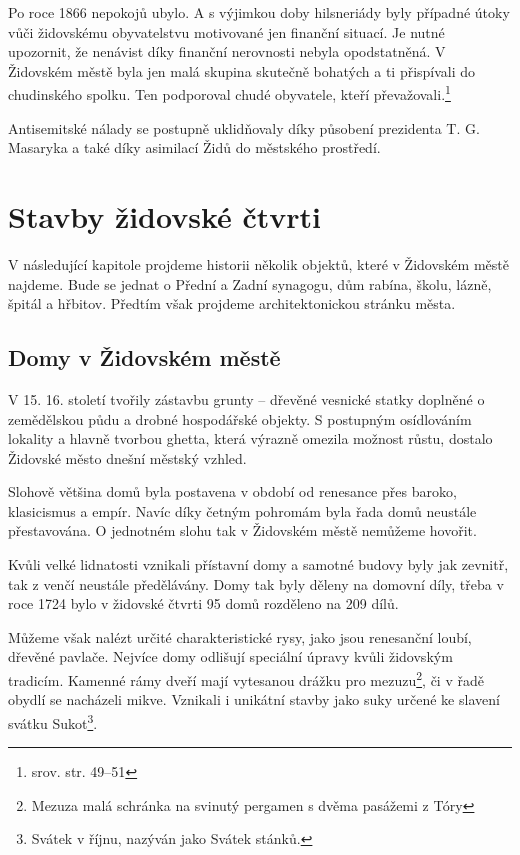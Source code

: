 \documentclass[a4paper,oneside,12pt]{report}
\begin{document}
Po roce 1866 nepokojů ubylo.
A s výjimkou doby hilsneriády byly případné útoky vůči židovskému obyvatelstvu motivované jen finanční situací.
Je nutné upozornit, že nenávist díky finanční nerovnosti nebyla opodstatněná.
V Židovském městě byla jen malá skupina skutečně bohatých a ti přispívali do chudinského spolku.
Ten podporoval chudé obyvatele, kteří převažovali.\footnote{srov. \cite{Svobodva2015} str. 49--51}

Antisemitské nálady se postupně uklidňovaly díky působení prezidenta T. G. Masaryka a také díky asimilací Židů do městského prostředí.

\chapter{Stavby židovské čtvrti}

V následující kapitole projdeme historii několik objektů, které v Židovském městě najdeme.
Bude se jednat o Přední a Zadní synagogu, dům rabína, školu, lázně, špitál a hřbitov.
Předtím však projdeme architektonickou stránku města.

\section{Domy v Židovském městě}

V 15. 16. století tvořily zástavbu grunty -- dřevěné vesnické statky doplněné o zemědělskou půdu a drobné hospodářské objekty.
S postupným osídlováním lokality a hlavně tvorbou ghetta, která výrazně omezila možnost růstu, dostalo Židovské město dnešní městský vzhled.

Slohově většina domů byla postavena v období od renesance přes baroko, klasicismus a empír.
Navíc díky četným pohromám byla řada domů neustále přestavována.
O jednotném slohu tak v Židovském městě nemůžeme hovořit.

Kvůli velké lidnatosti vznikali přístavní domy a samotné budovy byly jak zevnitř, tak z venčí neustále předělávány.
Domy tak byly děleny na domovní díly, třeba v roce 1724 bylo v židovské čtvrti 95 domů rozděleno na 209 dílů.

Můžeme však nalézt určité charakteristické rysy, jako jsou renesanční loubí, dřevěné pavlače.
Nejvíce domy odlišují speciální úpravy kvůli židovským tradicím.
Kamenné rámy dveří mají vytesanou drážku pro mezuzu\footnote{Mezuza malá schránka na svinutý pergamen s dvěma pasážemi z Tóry}, či v řadě obydlí se nacházeli mikve.
Vznikali i unikátní stavby jako suky určené ke slavení svátku Sukot\footnote{Svátek v říjnu, nazýván jako Svátek stánků.}.
\end{document}
